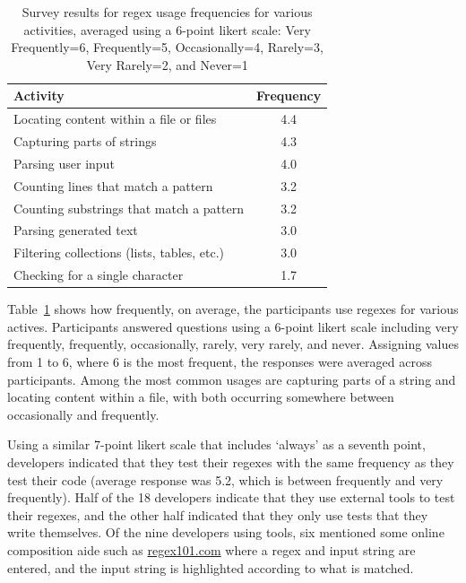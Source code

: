\begin{table}
\caption{Survey results for regex usage frequencies for various activities, averaged using a 6-point likert scale: Very Frequently=6, Frequently=5, Occasionally=4, Rarely=3, Very Rarely=2, and Never=1 \label{tab:regexactivities}}
\begin{center}
\begin{tabular}{l|c}
Activity & Frequency \\ \hline
Locating content within a file or files & 4.4\\
Capturing parts of strings & 4.3 \\
Parsing user input & 4.0\\
Counting lines that match a pattern & 3.2\\
Counting  substrings that match a pattern & 3.2\\
Parsing generated text & 3.0\\
Filtering collections (lists, tables, etc.) & 3.0 \\
Checking for a single character & 1.7\\


\end{tabular}
\end{center}
\end{table}

Table~\ref{tab:regexactivities} shows how frequently, on average, the participants use
regexes for various actives.
Participants answered questions using a 6-point likert scale including very frequently, frequently, occasionally, rarely, very rarely, and never.
Assigning values from 1 to 6, where 6 is the most frequent, the responses were averaged across participants.
Among the most common usages are capturing parts of a string and locating content within a file, with both occurring somewhere between occasionally and frequently.

Using a similar 7-point likert scale that includes `always' as a seventh point, developers indicated that they test their regexes with the same frequency as they test their code (average response was 5.2, which is between frequently and very frequently).  Half of the 18 developers indicate that they use external tools to test their regexes, and the other half indicated that they only use tests that they write themselves. Of the nine developers using tools, six mentioned some online composition aide such as \url{regex101.com} where a regex and input string are entered, and the input string is highlighted according to what is matched.

